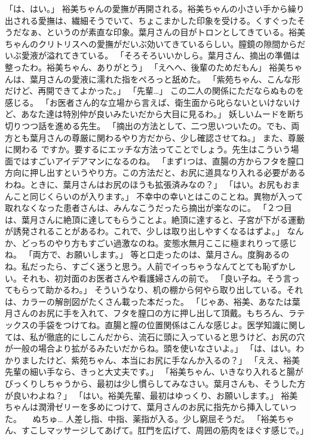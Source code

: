 「は、はい。」
裕美ちゃんの愛撫が再開される。裕美ちゃんの小さい手から繰り出される愛撫は、繊細そうでいて、ちょこまかした印象を受ける。くすぐったそうだなぁ、というのが素直な印象。葉月さんの目がトロンとしてきている。裕美ちゃんのクリトリスへの愛撫がだいぶ効いてきているらしい。膣鏡の隙間からだいぶ愛液が溢れてきている。
「そろそろいいかしら。葉月さん、摘出の準備は整ったわ。裕美ちゃん、ありがとう」
「えへへ、後輩のためだもん」
裕美ちゃんは、葉月さんの愛液に濡れた指をぺろっと舐めた。
「紫苑ちゃん、こんな形だけど、再開できてよかった。」
「先輩…」
この二人の関係にただならぬものを感じる。
「お医者さん的な立場から言えば、衛生面から叱らないといけないけど、あなた達は特別仲が良いみたいだから大目に見るわ。」
妖しいムードを断ち切りつつ話を進める先生。
「摘出の方法として、二つ思いついたの。でも、両方とも葉月さんの尊厳に関わるやり方だから、少し確認させてね。」
また、尊厳に関わる ですか。要するにエッチな方法ってことでしょう。先生はこういう場面ではすごいアイデアマンになるのね。
「まず1つは、直腸の方からフタを膣口方向に押し出すというやり方。この方法だと、お尻に道具なり入れる必要があるわね。ときに、葉月さんはお尻のほうも拡張済みなの？」
「はい。お尻もおまんこと同じくらいのが入ります。」
不幸中の幸いとはこのことね。異物が入って取れなくなった患者さんは、みんなこうだったら摘出が楽なのに。
「２つ目は、葉月さんに絶頂に達してもらうことよ。絶頂に達すると、子宮が下がる運動が誘発されることがあるわ。これで、少しは取り出しやすくなるはずよ。」
なんか、どっちのやり方もすごい過激なのね。変態水無月ここに極まれりって感じね。
「両方で、お願いします。」
等と口走ったのは、葉月さん。度胸あるのね。私だったら、すごく迷うと思う。人前でイっちゃうなんてとても恥ずかしい。それも、初対面のお医者さんや看護婦さんの前で。
「良い子ね。そう言ってもらって助かるわ。」
そういうなり、机の棚から何やら取り出している。それは、カラーの解剖図がたくさん載った本だった。
「じゃあ、裕美、あなたは葉月さんのお尻に手を入れて、フタを膣口の方に押し出して頂戴。もちろん、ラテックスの手袋をつけてね。直腸と膣の位置関係はこんな感じよ。医学知識に関しては、私が徹底的にしこんだから、流石に頭に入っていると思うけど、お尻の穴が一般の場合より拡がるみたいだからね。頭を使いなさいよ。」
「は、はい。わかりましたけど、紫苑ちゃん、本当にお尻に手なんか入るの？」
「ええ、裕美先輩の細い手なら、きっと大丈夫です。」
「裕美ちゃん、いきなり入れると腸がびっくりしちゃうから、最初は少し慣らしてみなさい。葉月さんも、そうした方が良いわよね？」
「はい。裕美先輩、最初はゆっくり、お願いします。」
裕美ちゃんは潤滑ゼリーを多めにつけて、葉月さんのお尻に指先から挿入していった。
　ぬちゅ…
人差し指、中指、薬指が入る。少し窮屈そうだ。
「裕美ちゃん、すこしマッサージしてあげて。肛門を広げて、周囲の筋肉をほぐす感じで。」
